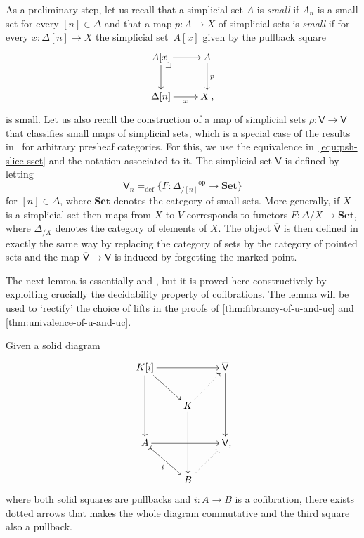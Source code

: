 \documentclass[reqno,10pt,a4paper,oneside]{amsart}
\makeatletter
\numberwithin{equation}{section}
\theoremstyle{mythm}
\theoremstyle{mydef}
\theoremstyle{myrmk}
\newcommand{\pullback}[1]{\save*!/#1-1.2pc/#1:(-1,1)@^{|-}\restore}
\newcommand{\drpullback}{\pullback{dr}}
\newcommand{\defeq}{=_{\operatorname{def}}}
\newcommand{\co}{\colon}
\newcommand{\op}{\operatorname{op}}
\newcommand{\VV}{\overline{\mathsf{V}}}
\newcommand{\V}{\mathsf{V}}
\newcommand{\Set}{\mathbf{Set}}
\makeatother
\begin{document}
\medskip

As a preliminary step, let us recall that a simplicial set $A$ is \emph{small}  if $A_n$ is a small set for every $[n] \in \Delta$ and that a map $p \co A \to X$ of simplicial sets is \emph{small} if for every $x \co \Delta[n] 
\to X$ the simplicial set~$A[x]$ given by the pullback square
\[
\xymatrix{
A[x] \ar[r] \ar[d] \drpullback & A \ar[d]^{p} \\
\Delta[n] \ar[r]_-{x} & X \, , }
\]
is small. Let us also recall the  construction of a map of simplicial sets $\rho \co \VV \to \V$ that classifies
small maps of simplicial sets, which is a special case of the results in~\cite{hofmann-streicher-universes} for arbitrary presheaf categories.  For this, we use the equivalence in~\eqref{equ:psh-slice-sset} and the notation associated to it.
The simplicial set $\V$ is defined by letting
\[
\mathsf{V}_n \defeq \{ F \co {\Delta_{/[n]}}^{\op} \to \Set \}
\]
for $[n] \in \Delta$, where $\Set$ denotes the category of small sets. More generally, if $X$ is a simplicial set then maps from $X$ to $V$ corresponds to functors $F: \Delta/X \to \Set$, where $\Delta_{/X}$ denotes the category of elements of $X$.
The object $\VV$ is then defined in exactly the same way by replacing the category of sets by the category of pointed sets and the map $\VV \to \V$ is induced by forgetting the marked point.

The next lemma is essentially \cite[Lemma~3.9]{cisinski-univalent-universes} and 
\cite[Property~$(2')$]{ShulmanM:unierp}, but it is proved here constructively by 
exploiting crucially the decidability property of cofibrations. The lemma will be used to `rectify' the 
choice of lifts in the proofs of \cref{thm:fibrancy-of-u-and-uc} and \cref{thm:univalence-of-u-and-uc}. 

\begin{lemma}  \label{thm:rectify-via-decidability}
Given a solid diagram
\[\xymatrix{
K[i] \ar[rr] \ar[dr] \ar[dd] & & \VV \ar[dd] \\
 & K \ar[dd] \ar@{.>}[ur] & \\
A \ar[rr] \ar@{>->}[dr]_i & & \V \mathrlap{,} \\
 &B \ar@{.>}[ur]&  
}\]
where both solid squares are pullbacks and $i \co A \to B$ is a cofibration, there exists dotted arrows that makes  the whole diagram commutative and the third square also a pullback.
\end{lemma}
\end{document}
